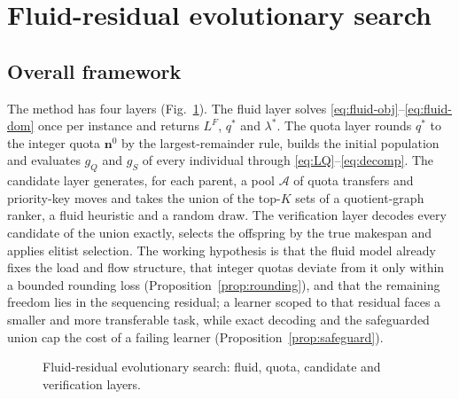 \section{Fluid-residual evolutionary search}\label{sec:method}

\subsection{Overall framework}\label{sec:framework}
The method has four layers (Fig.~\ref{fig:framework}). The fluid layer solves \eqref{eq:fluid-obj}--\eqref{eq:fluid-dom}
once per instance and returns $L^F$, $q^*$ and $\lambda^*$. The quota layer rounds $q^*$ to the integer quota
$\mathbf{n}^0$ by the largest-remainder rule, builds the initial population and evaluates $g_Q$ and $g_S$ of every
individual through \eqref{eq:LQ}--\eqref{eq:decomp}. The candidate layer generates, for each parent, a pool $\mathcal{A}$ of
quota transfers and priority-key moves and takes the union of the top-$K$ sets of a quotient-graph ranker, a fluid heuristic
and a random draw. The verification layer decodes every candidate of the union exactly, selects the offspring by the true
makespan and applies elitist selection. The working hypothesis is that the fluid model already fixes the load and flow
structure, that integer quotas deviate from it only within a bounded rounding loss (Proposition~\ref{prop:rounding}), and
that the remaining freedom lies in the sequencing residual; a learner scoped to that residual faces a smaller and more
transferable task, while exact decoding and the safeguarded union cap the cost of a failing learner
(Proposition~\ref{prop:safeguard}).

\begin{figure}
\caption{Fluid-residual evolutionary search: fluid, quota, candidate and verification layers.}\label{fig:framework}
\end{figure}

